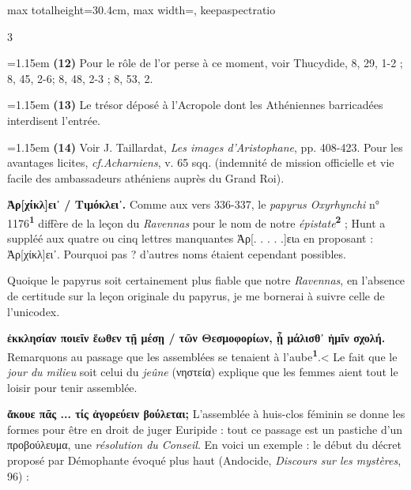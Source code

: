 \documentclass[11pt,twoside]{book}
\newcommand{\italique}[1]{\textit{#1}}
\newcommand{\cf}{\textit{cf.}\xspace}
\newcommand{\grec}[1]{{\policeGr #1}}
\newcommand{\marqueur}[1]{\textsuperscript{\color{rubricRed}\textbf{#1}}}
\begin{document}
\begin{adjustbox}{max totalheight=30.4cm, max width=\textwidth, keepaspectratio}
\begin{minipage}{\textwidth}
{\begin{multicols}{3}
\par\vspace{1.5pt}
\noindent\hangindent=1.15em {\color{sepiaNote}\textbf{(12)}} Pour le rôle de l'or perse à ce moment, voir Thucydide, 8, 29, 1-2 ; 8, 45, 2-6; 8, 48, 2-3 ; 8, 53, 2.
\par\vspace{1.5pt}
\noindent\hangindent=1.15em {\color{sepiaNote}\textbf{(13)}} Le trésor déposé à l'Acropole dont les Athéniennes barricadées interdisent l'entrée.
\par\vspace{1.5pt}
\noindent\hangindent=1.15em {\color{sepiaNote}\textbf{(14)}} Voir J. Taillardat, \italique{Les images d'Aristophane}, pp. 408-423. Pour les avantages licites, \cf \italique{Acharniens}, v. 65 sqq. (indemnité de mission officielle et vie facile des ambassadeurs athéniens auprès du Grand Roi).
\par\vspace{1.5pt}
 \textbf{Ἀρ[χίκλ]ει᾽ / Τιμόκλει᾽.} Comme aux vers 336-337, le \italique{papyrus Oxyrhynchi} n° 1176\marqueur{1} diffère de la leçon du \italique{Ravennas} pour le nom de notre \italique{épistate}\marqueur{2} ; Hunt a suppléé aux quatre ou cinq lettres manquantes Ἀρ[. . . . .]ειa en proposant : Ἀρ[χίκλ]ει᾽. Pourquoi pas ? d'autres noms étaient cependant possibles.
\par\vspace{1.5pt}
\noindent Quoique le papyrus soit certainement plus fiable que notre \italique{Ravennas}, en l'absence de certitude sur la leçon originale du papyrus, je me bornerai à suivre celle de l'unicodex.
\par\vspace{1.5pt}
 \textbf{ἐκκλησίαν ποιεῖν ἕωθεν τῇ μέσῃ / τῶν Θεσμοφορίων, ᾗ μάλισθ᾽ ἡμῖν σχολή.} Remarquons au passage que les assemblées se tenaient à l'aube\marqueur{1}.< Le fait que le \italique{jour du milieu} soit celui du \italique{jeûne} (νηστεία) explique que les femmes aient tout le loisir pour tenir assemblée.
\par\vspace{1.5pt}
 \textbf{ἄκουε πᾶς ... τίς ἀγορεύειν βούλεται;} L'assemblée à huis-clos féminin se donne les formes pour être en droit de juger Euripide : tout ce passage est un pastiche d'un \grec{προβούλευμα}, une \italique{résolution du Conseil}. En voici un exemple : le début du décret proposé par Démophante évoqué plus haut (Andocide, \italique{Discours sur les mystères}, 96) :

\end{multicols}}
\end{minipage}
\end{adjustbox}
\end{document}

